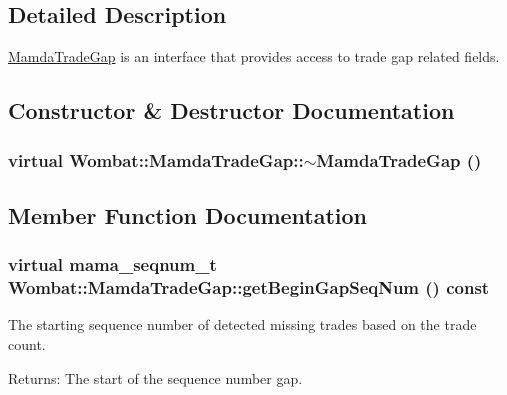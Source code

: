 \subsection{Detailed Description}
\hyperlink{classWombat_1_1MamdaTradeGap}{Mamda\-Trade\-Gap} is an interface that provides access to trade gap related fields. 



\subsection{Constructor \& Destructor Documentation}
\hypertarget{classWombat_1_1MamdaTradeGap_fd26421b7a89895ebdee612cab74f78e}{
\subsubsection[$\sim$MamdaTradeGap]{\setlength{\rightskip}{0pt plus 5cm}virtual Wombat::Mamda\-Trade\-Gap::$\sim$Mamda\-Trade\-Gap ()}}
\label{classWombat_1_1MamdaTradeGap_fd26421b7a89895ebdee612cab74f78e}




\subsection{Member Function Documentation}
\hypertarget{classWombat_1_1MamdaTradeGap_1b3619649178e414cbee977c9f16d125}{
\subsubsection[getBeginGapSeqNum]{\setlength{\rightskip}{0pt plus 5cm}virtual mama\_\-seqnum\_\-t Wombat::Mamda\-Trade\-Gap::get\-Begin\-Gap\-Seq\-Num () const}}
\label{classWombat_1_1MamdaTradeGap_1b3619649178e414cbee977c9f16d125}


The starting sequence number of detected missing trades based on the trade count. 

\begin{Desc}
\item[Returns:]The start of the sequence number gap. \end{Desc}


